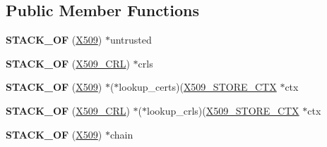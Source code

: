 \subsection*{Public Member Functions}
\begin{DoxyCompactItemize}
\item 
\mbox{\label{structx509__store__ctx__st_a517077c8ae62ceb22890ccb6a81d25ef}} 
{\bfseries S\+T\+A\+C\+K\+\_\+\+OF} (\hyperlink{structx509__st}{X509}) $\ast$untrusted
\item 
\mbox{\label{structx509__store__ctx__st_ab57fcf4d3e8e33f1f34bc2f50ca9f95b}} 
{\bfseries S\+T\+A\+C\+K\+\_\+\+OF} (\hyperlink{structX509__crl__st}{X509\+\_\+\+C\+RL}) $\ast$crls
\item 
\mbox{\label{structx509__store__ctx__st_a8aa85e3cf843718ac7bd414facebeeb3}} 
{\bfseries S\+T\+A\+C\+K\+\_\+\+OF} (\hyperlink{structx509__st}{X509}) $\ast$($\ast$lookup\+\_\+certs)(\hyperlink{structx509__store__ctx__st}{X509\+\_\+\+S\+T\+O\+R\+E\+\_\+\+C\+TX} $\ast$ctx
\item 
\mbox{\label{structx509__store__ctx__st_adb9ab5bd5993b76c920efb93dbfb3983}} 
{\bfseries S\+T\+A\+C\+K\+\_\+\+OF} (\hyperlink{structX509__crl__st}{X509\+\_\+\+C\+RL}) $\ast$($\ast$lookup\+\_\+crls)(\hyperlink{structx509__store__ctx__st}{X509\+\_\+\+S\+T\+O\+R\+E\+\_\+\+C\+TX} $\ast$ctx
\item 
\mbox{\label{structx509__store__ctx__st_a364fd53075271cda975dc21f837258d8}} 
{\bfseries S\+T\+A\+C\+K\+\_\+\+OF} (\hyperlink{structx509__st}{X509}) $\ast$chain
\end{DoxyCompactItemize}
